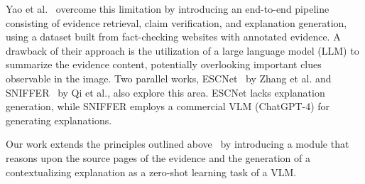 Yao et al.~\cite{yao2023end} overcome this limitation by introducing an end-to-end pipeline consisting of evidence retrieval, claim verification, and explanation generation, using a dataset built from fact-checking websites with annotated evidence. A drawback of their approach is the utilization of a large language model (LLM) to summarize the evidence content, potentially overlooking important clues observable in the image.
Two parallel works, ESCNet~\cite{zhang2024escnet} by Zhang et al. and SNIFFER~\cite{qi2024sniffer} by Qi et al., also explore this area. ESCNet lacks explanation generation, while SNIFFER employs a commercial VLM (ChatGPT-4) for generating explanations.

Our work extends the principles outlined above~\cite{abdelnabi2022open, yao2023end} by introducing a module that reasons upon the source pages of the evidence and the generation of a contextualizing explanation as a zero-shot learning task of a VLM.